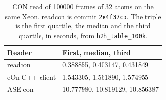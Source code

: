 \begin{table}[tbp]
\centering
\caption{CON read of \num{100000} frames of 32 atoms on the same Xeon.
readcon is commit \texttt{2e4f37cb}.
The triple is the first quartile, the median and the third quartile, in seconds, from \texttt{h2h\_table\_100k}.}
\label{tab:conread}
\begin{tabular}{@{}ll@{}}
\toprule
Reader & First, median, third \\
\midrule
readcon & 0.388855, 0.403147, 0.431849 \\
eOn C++ client & 1.543305, 1.561890, 1.574955 \\
ASE eon & 10.777980, 10.819129, 10.856387 \\
\bottomrule
\end{tabular}
\end{table}
